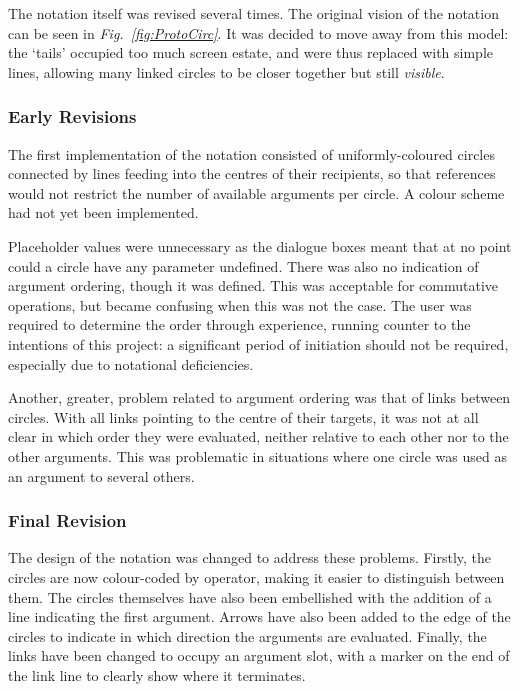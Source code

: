 \documentclass[12pt,twoside,notitlepage,xetex]{report}
\begin{document}
The notation itself was revised several times.  The original vision of the notation can be seen in \emph{Fig.~\ref{fig:ProtoCirc}}.  It was decided to move away from this model: the `tails' occupied too much screen estate, and were thus replaced with simple lines, allowing many linked circles to be closer together but still \emph{visible}.

\subsubsection{Early Revisions}

The first implementation of the notation consisted of uniformly-coloured circles connected by lines feeding into the centres of their recipients, so that references would not restrict the number of available arguments per circle.  A colour scheme had not yet been implemented.

Placeholder values were unnecessary as the dialogue boxes meant that at no point could a circle have any parameter undefined.  There was also no indication of argument ordering, though it was defined.  This was acceptable for commutative operations, but became confusing when this was not the case. The user was required to determine the order through experience, running counter to the intentions of this project: a significant period of initiation should not be required, especially due to notational deficiencies.

Another, greater, problem related to argument ordering was that of links between circles.  With all links pointing to the centre of their targets, it was not at all clear in which order they were evaluated, neither relative to each other nor to the other arguments.  This was problematic in situations where one circle was used as an argument to several others.


\subsubsection{Final Revision}
The design of the notation was changed to address these problems.  Firstly, the circles are now colour-coded by operator, making it easier to distinguish between them.  The circles themselves have also been embellished with the addition of a line indicating the first argument.  Arrows have also been added to the edge of the circles to indicate in which direction the arguments are evaluated.  Finally, the links have been changed to occupy an argument slot, with a marker on the end of the link line to clearly show where it terminates.
\end{document}
